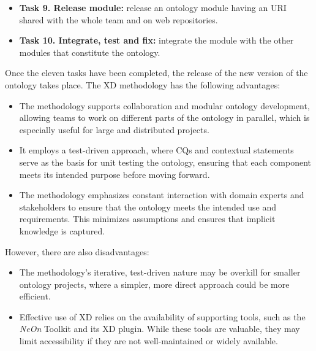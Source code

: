 \begin{itemize}
    \item \textbf{Task 9. Release module:} release an ontology module having an URI shared with the whole team and on web repositories.

    \item \textbf{Task 10. Integrate, test and fix:} integrate the module with the other modules that constitute the ontology.
\end{itemize}

Once the eleven tasks have been completed, the release of the new version of the ontology takes place.
The XD methodology has the following advantages:
\begin{itemize}
    \item The methodology supports collaboration and modular ontology development, allowing teams to work on different parts of the ontology in parallel, which is especially useful for large and distributed projects.

    \item It employs a test-driven approach, where CQs and contextual statements serve as the basis for unit testing the ontology, ensuring that each component meets its intended purpose before moving forward.

    \item The methodology emphasizes constant interaction with domain experts and stakeholders to ensure that the ontology meets the intended use and requirements. This minimizes assumptions and ensures that implicit knowledge is captured.
\end{itemize}
However, there are also disadvantages:
\begin{itemize}
    \item The methodology's iterative, test-driven nature may be overkill for smaller ontology projects, where a simpler, more direct approach could be more efficient.

    \item Effective use of XD relies on the availability of supporting tools, such as the \textit{NeOn} Toolkit and its XD plugin. While these tools are valuable, they may limit accessibility if they are not well-maintained or widely available.
\end{itemize}

